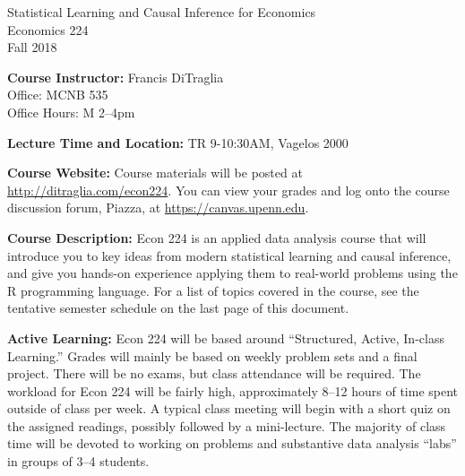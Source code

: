 \documentclass[11pt, letterpaper]{article}
\begin{document}
\thispagestyle{plain}

\begin{center}
\Large
\sc
Statistical Learning and Causal Inference for Economics\\
\large
Economics 224\\
\large
Fall 2018
\end{center}



\normalsize

\noindent \textbf{Course Instructor:} Francis DiTraglia \\
Office: MCNB 535\\
Office Hours: M 2--4pm 

\medskip


%
%
%
% 
\noindent \textbf{Lecture Time and Location:} TR 9-10:30AM, Vagelos 2000 



\medskip
 
\noindent \textbf{Course Website:} Course materials will be posted at \url{http://ditraglia.com/econ224}.
You can view your grades and log onto the course discussion forum, Piazza, at \url{https://canvas.upenn.edu}.

\medskip



\noindent \textbf{Course Description:} Econ 224 is an applied data analysis course that will introduce you to key ideas from modern statistical learning and causal inference, and give you hands-on experience applying them to real-world problems using the R programming language.
For a list of topics covered in the course, see the tentative semester schedule on the last page of this document.

\medskip

\noindent \textbf{Active Learning:} Econ 224 will be based around ``Structured, Active, In-class Learning.'' 
Grades will mainly be based on weekly problem sets and a final project.
There will be no exams, but class attendance will be required.
The workload for Econ 224 will be fairly high, approximately 8--12 hours of time spent outside of class per week.
A typical class meeting will begin with a short quiz on the assigned readings, possibly followed by a mini-lecture. 
The majority of class time will be devoted to working on problems and substantive data analysis ``labs'' in groups of 3--4 students.
\end{document}
